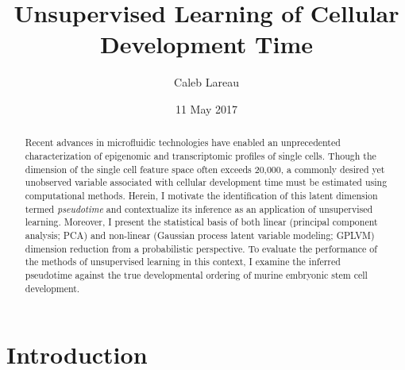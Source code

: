 \documentclass[english, 11pt]{article}\usepackage[]{graphicx}\usepackage[]{color}
\begin{document}
\title{Unsupervised Learning of Cellular Development Time}


\author{Caleb Lareau}


\date{11 May 2017}
\maketitle
\begin{abstract}
\noindent Recent advances in microfluidic technologies have enabled an unprecedented characterization of epigenomic and transcriptomic profiles of single cells. Though the dimension of the single cell feature space often exceeds 20,000, a commonly desired yet unobserved variable associated with cellular development time must be estimated using computational methods. Herein, I motivate the identification of this latent dimension termed \textit{pseudotime} and contextualize its inference as an application of unsupervised learning. Moreover, I present the statistical basis of both linear (principal component analysis; PCA) and non-linear (Gaussian process latent variable modeling; GPLVM) dimension reduction from a probabilistic perspective. To evaluate the performance of the methods of unsupervised learning in this context, I examine the inferred pseudotime against the true developmental ordering of murine embryonic stem cell development. 

\newpage{}
\end{abstract}





\section{Introduction}
\end{document}
